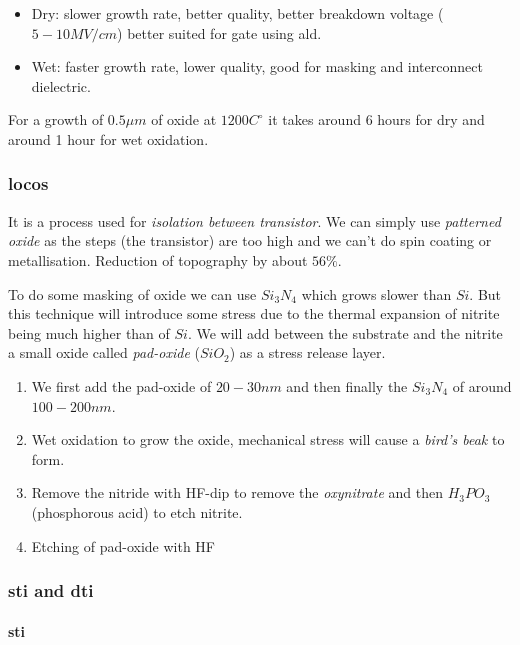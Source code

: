 \documentclass[
]{article}
\begin{document}
\begin{itemize}
\item
  Dry: slower growth rate, better quality, better breakdown voltage
  (\(5-10MV/cm\)) better suited for gate using {ald}.
\item
  Wet: faster growth rate, lower quality, good for masking and
  interconnect dielectric.
\end{itemize}

For a growth of \(0.5\mu m\) of oxide at \(1200 C^\circ\) it takes
around 6 hours for dry and around 1 hour for wet oxidation.

\hypertarget{locos}{%
\subsubsection{\texorpdfstring{{locos}}{locos}}\label{locos}}

It is a process used for \emph{isolation between transistor}. We can
simply use \emph{patterned oxide} as the steps (the transistor) are too
high and we can't do spin coating or metallisation. Reduction of
topography by about \(56\%\).

To do some masking of oxide we can use \(Si_3N_4\) which grows slower
than \(Si\). But this technique will introduce some stress due to the
thermal expansion of nitrite being much higher than of \(Si\). We will
add between the substrate and the nitrite a small oxide called
\emph{pad-oxide} (\(SiO_2\)) as a stress release layer.

\begin{enumerate}
\def\labelenumi{\arabic{enumi}.}
\item
  We first add the pad-oxide of \(20-30nm\) and then finally the
  \(Si_3N_4\) of around \(100-200nm\).
\item
  Wet oxidation to grow the oxide, mechanical stress will cause a
  \emph{bird's beak} to form.
\item
  Remove the nitride with HF-dip to remove the \emph{oxynitrate} and
  then \(H_3PO_3\) (phosphorous acid) to etch nitrite.
\item
  Etching of pad-oxide with HF
\end{enumerate}

\hypertarget{sti-and-dti}{%
\subsubsection{\texorpdfstring{{sti} and
{dti}}{sti and dti}}\label{sti-and-dti}}

\hypertarget{sti}{%
\paragraph{\texorpdfstring{{sti}}{sti}}\label{sti}}
\end{document}
